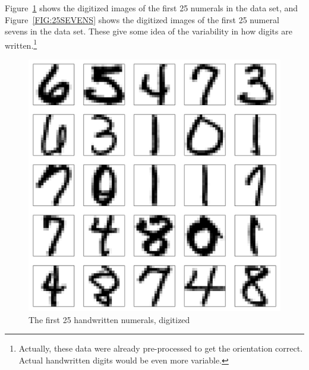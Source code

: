 \documentclass[12pt,oneside]{book}\usepackage[]{graphicx}\usepackage[]{color}
\makeatletter
\def\maxwidth{ %
  \ifdim\Gin@nat@width>\linewidth
    \linewidth
  \else
    \Gin@nat@width
  \fi
}
\newenvironment{knitrout}{}{} %
\makeatother
\begin{document}
Figure~\ref{FIG:25DIGITS} shows the digitized images of the first 25 numerals in the data set, and Figure~\ref{FIG:25SEVENS} shows the digitized images of the first 25 numeral sevens in the data set. These give some idea of the variability in how digits are written.\footnote{Actually, these data were already pre-processed to get the orientation correct. Actual handwritten digits would be even more variable.}
\begin{figure}[htbp]
\begin{knitrout}
\color{fgcolor}
\includegraphics[width=\maxwidth]{figure/unnamed-chunk-14-1} 

\end{knitrout}
\caption{The first 25 handwritten numerals, digitized}
\label{FIG:25DIGITS}
\end{figure}
 
\end{document}
